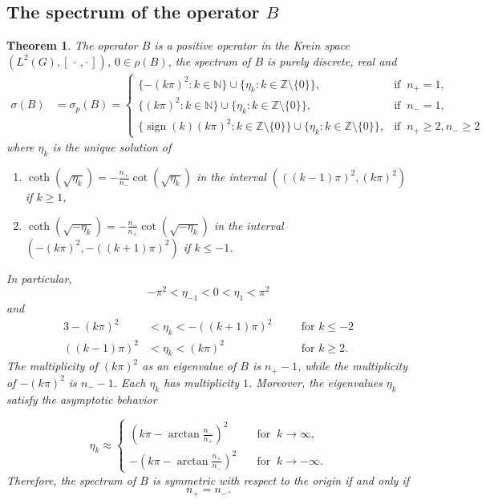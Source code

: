 \documentclass{article}
\numberwithin{equation}{section}
\newtheorem{theorem}{Theorem}[section]
\theoremstyle{definition}
\newcommand{\kip}{[\,\cdot\, , \cdot\,]}
\newcommand{\N}{\mathbb{N}}
\newcommand{\Z}{\mathbb{Z}}
\DeclareMathOperator{\sign}{sign}
\newcommand{\AK}{A}
\newcommand{\AKone}{B}
\begin{document}
\subsection{The spectrum of the operator $B$}
\begin{theorem}
\label{thm:spectrumB}
   The operator $B$ is a positive operator in the Krein space $(L^2(G), \kip)$, $0\in \rho(B)$, the spectrum of $\AKone$ is purely discrete, real and 
   \begin{align*}
   	\sigma(\AKone) &=  \sigma_p(\AKone) =
        \begin{cases}
        \{ -(k\pi )^2: k\in\N \}\cup \{ \eta_{k} : k\in\mathbb Z \setminus\{0\} \},
        &\text{if }\ n_+=1,
        \\[1ex]
        \{ (k\pi )^2: k\in\N \}\cup \{ \eta_{k} : k\in\mathbb Z \setminus\{0\} \},
        &\text{if }\ n_-=1,
        \\[1ex]
        \{ \sign(k)(k\pi )^2: k\in\Z\setminus\{0\} \}\cup \{ \eta_{k} : k\in\mathbb Z \setminus\{0\} \},
        &\text{if }\ n_+\ge 2, n_-\ge 2
        \end{cases}
   \end{align*}
   where $\eta_k$ is the unique solution of 
   \begin{enumerate}[label={\upshape(\roman*)}]
   	\item $\coth(\sqrt{\eta_k}) = - \frac{n_+}{n_-}\cot(\sqrt{\eta_k})$ in the interval $( ((k-1)\pi)^2, (k\pi)^2 )$ if $k\ge 1$,
   	\item $\coth(\sqrt{-\eta_k}) = - \frac{n_-}{n_+}\cot(\sqrt{-\eta_k})$ in the interval $( -(k\pi)^2, -((k+1)\pi)^2 )$ if $k\le -1$.
   \end{enumerate}
   In particular, 
   \begin{equation*}
      -\pi^2 < \eta_{-1} <  0 < \eta_1 < \pi^2
   \end{equation*}
   and
   \begin{alignat*}{3}
      -(k\pi)^2 &< \eta_k < -((k+1)\pi)^2 
      && \quad\text{for } k\le -2\\
      ((k-1)\pi)^2 &< \eta_k < (k\pi)^2 
      && \quad\text{for } k\ge 2.
   \end{alignat*}
   The multiplicity of $(k\pi)^2$ as an eigenvalue of $\AKone$ is $n_{+} - 1$, while the multiplicity of $-(k\pi)^2$ is $n_{-} - 1$. Each $\eta_k$ has multiplicity $1$. Moreover, the eigenvalues $\eta_k$ satisfy the asymptotic behavior
   
   \begin{equation*}
   	\eta_{k} \approx 
   	\begin{cases}
   		\left( k\pi - \arctan \frac{n_-}{n_+} \right)^2 \quad & \text{for }\ k\to\infty,\\[1ex]
   		-\left( k\pi - \arctan \frac{n_+}{n_-} \right)^2 \quad
   		&\text{for }\ k\to -\infty.
   	\end{cases}
   \end{equation*}
   Therefore, the spectrum of $B$ is symmetric with respect to the origin if and only if
   $$
   n_+=n_-.
   $$
\end{theorem}
\end{document}
